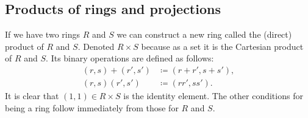 \documentclass[10pt, a4paper]{article}
\begin{document}
\subsection{Products of rings and projections}
If we have two rings $R$ and $S$ we can construct a new ring called the
(direct)
product of $R$ and $S$.
Denoted $R \times S$ because as a set it is the Cartesian product of $R$ and $S$.
Its binary operations are defined as follows:
\begin{align*}
    (r, s) + (r', s') &\coloneqq (r + r', s + s'), \\
    (r, s)(r', s') &\coloneqq (rr', ss').
\end{align*}
It is clear that $(1, 1) \in R \times S$ is the identity element.
The other conditions for being a ring follow immediately from those for $R$ and $S$.
\end{document}

